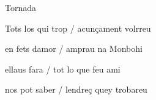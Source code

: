 \documentclass[12pt]{article}
\begin{document}
\begin{estrofaExtra}%




\begin{tornada}

Tornada

\end{tornada}


\end{estrofaExtra}


\begin{estrofa}

 Tots los qui trop / acun\c{c}ament volrreu

 en fets damor / amprau na Monbohi

 ellaus fara / tot lo que feu ami

 nos pot saber / lendre\c{c} quey trobareu

\end{estrofa}
\end{document}
